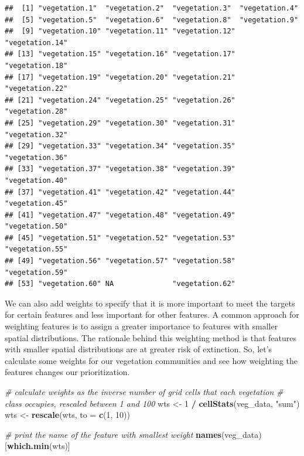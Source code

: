 \documentclass[12pt,]{book}
\newenvironment{Shaded}{\begin{snugshade}}{\end{snugshade}}
\newcommand{\KeywordTok}[1]{\textcolor[rgb]{0.13,0.29,0.53}{\textbf{#1}}}
\newcommand{\DataTypeTok}[1]{\textcolor[rgb]{0.13,0.29,0.53}{#1}}
\newcommand{\DecValTok}[1]{\textcolor[rgb]{0.00,0.00,0.81}{#1}}
\newcommand{\StringTok}[1]{\textcolor[rgb]{0.31,0.60,0.02}{#1}}
\newcommand{\CommentTok}[1]{\textcolor[rgb]{0.56,0.35,0.01}{\textit{#1}}}
\newcommand{\OperatorTok}[1]{\textcolor[rgb]{0.81,0.36,0.00}{\textbf{#1}}}
\newcommand{\NormalTok}[1]{#1}
\begin{document}
\begin{verbatim}
##  [1] "vegetation.1"  "vegetation.2"  "vegetation.3"  "vegetation.4" 
##  [5] "vegetation.5"  "vegetation.6"  "vegetation.8"  "vegetation.9" 
##  [9] "vegetation.10" "vegetation.11" "vegetation.12" "vegetation.14"
## [13] "vegetation.15" "vegetation.16" "vegetation.17" "vegetation.18"
## [17] "vegetation.19" "vegetation.20" "vegetation.21" "vegetation.22"
## [21] "vegetation.24" "vegetation.25" "vegetation.26" "vegetation.28"
## [25] "vegetation.29" "vegetation.30" "vegetation.31" "vegetation.32"
## [29] "vegetation.33" "vegetation.34" "vegetation.35" "vegetation.36"
## [33] "vegetation.37" "vegetation.38" "vegetation.39" "vegetation.40"
## [37] "vegetation.41" "vegetation.42" "vegetation.44" "vegetation.45"
## [41] "vegetation.47" "vegetation.48" "vegetation.49" "vegetation.50"
## [45] "vegetation.51" "vegetation.52" "vegetation.53" "vegetation.55"
## [49] "vegetation.56" "vegetation.57" "vegetation.58" "vegetation.59"
## [53] "vegetation.60" NA              "vegetation.62"
\end{verbatim}

We can also add weights to specify that it is more important to meet the
targets for certain features and less important for other features. A
common approach for weighting features is to assign a greater importance
to features with smaller spatial distributions. The rationale behind
this weighting method is that features with smaller spatial
distributions are at greater risk of extinction. So, let's calculate
some weights for our vegetation communities and see how weighting the
features changes our prioritization.

\begin{Shaded}
\begin{Highlighting}[]
\CommentTok{# calculate weights as the inverse number of grid cells that each vegetation}
\CommentTok{# class occupies, rescaled between 1 and 100}
\NormalTok{wts <-}\StringTok{ }\DecValTok{1} \OperatorTok{/}\StringTok{ }\KeywordTok{cellStats}\NormalTok{(veg_data, }\StringTok{"sum"}\NormalTok{)}
\NormalTok{wts <-}\StringTok{ }\KeywordTok{rescale}\NormalTok{(wts, }\DataTypeTok{to =} \KeywordTok{c}\NormalTok{(}\DecValTok{1}\NormalTok{, }\DecValTok{10}\NormalTok{))}

\CommentTok{# print the name of the feature with smallest weight}
\KeywordTok{names}\NormalTok{(veg_data)[}\KeywordTok{which.min}\NormalTok{(wts)]}
\end{Highlighting}
\end{Shaded}
\end{document}
